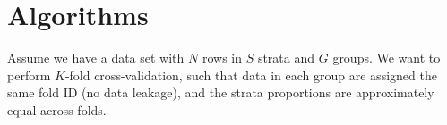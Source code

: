 \documentclass[twoside]{article}
\begin{document}


\section{Algorithms}

Assume we have a data set with $N$ rows in $S$ strata and $G$ groups.
We want to perform $K$-fold cross-validation, such that data in each group are assigned the same fold ID (no data leakage), and the strata proportions are approximately equal across folds.
\end{document}

